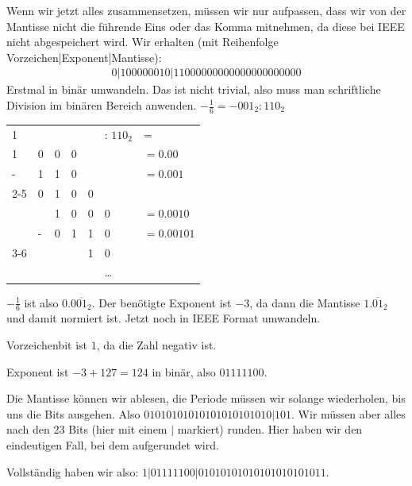 \documentclass{scrartcl}
\begin{document}
{		Wenn wir jetzt alles zusammensetzen, müssen wir nur aufpassen, dass wir von der Mantisse nicht die führende Eins oder das Komma mitnehmen, da diese bei IEEE nicht abgespeichert wird. Wir erhalten (mit Reihenfolge Vorzeichen|Exponent|Mantisse):
		\begin{align*}
			0|100000010|11000000000000000000000
		\end{align*}
		\itemf Erstmal in binär umwandeln. Das ist nicht trivial, also muss man schriftliche Division im binären Bereich anwenden.
		$-\frac{1}{6} = -001_2 : 110_2$
		\begin{table}[H]
			\centering
			\label{table:dec>binary1}
			\begin{tabular}{lllllll}
				1 & & & & & : $110_2$ &= \\
				1 & 0 & 0 & 0 & & &$=0.00$\\
				- & 1 & 1 & 0 & & &$=0.001$\\ \cline{2-5}
				  & 0 & 1 & 0 & 0 & &\\
				  &  & 1 & 0 & 0 & 0 &$=0.0010$\\
				  & - & 0 & 1 & 1 & 0 &$=0.00101$\\ \cline{3-6}
				  &   &   &   & 1 & 0 &\\
				  & & & & & \dots 
			\end{tabular}
		\end{table}
		$-\frac{1}{6}$ ist also $0.0\overline{01}_2$. Der benötigte Exponent ist $-3$, da dann die Mantisse $1.\overline{01}_2$ und damit normiert ist. Jetzt noch in IEEE Format umwandeln.
		
		Vorzeichenbit ist $1$, da die Zahl negativ ist.
		
		Exponent ist $-3+127 = 124$ in binär, also $01111100$. 
		
		Die Mantisse können wir ablesen, die Periode müssen wir solange wiederholen, bis uns die Bits ausgehen. Also $01010101010101010101010|101$. Wir müssen aber alles nach den 23 Bits (hier mit einem $|$ markiert) runden. Hier haben wir den eindeutigen Fall, bei dem aufgerundet wird.
		
		Vollständig haben wir also: $1|01111100|01010101010101010101011$.
	}
\end{document}
